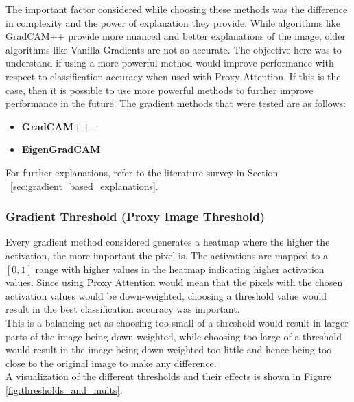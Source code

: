 \documentclass[a4paper,11pt,openright]{book}
\begin{document}
The important factor considered while choosing these methods was the difference in complexity and the power of explanation they provide. While algorithms like GradCAM++ \cite{chattopadhayGradCAMGeneralizedGradientBased2018} provide more nuanced and better explanations of the image, older algorithms like Vanilla Gradients \cite{zeilerVisualizingUnderstandingConvolutional2013} are not so accurate. The objective here was to understand if using a more powerful method would improve performance with respect to classification accuracy when used with Proxy Attention. If this is the case, then it is possible to use more powerful methods to further improve performance in the future.
The gradient methods that were tested are as follows:
\begin{itemize}
    \item \textbf{GradCAM++} \cite{chattopadhayGradCAMGeneralizedGradientBased2018}.
    \item \textbf{EigenGradCAM} \cite{banymuhammadEigenCAMVisualExplanations2021}
\end{itemize}
For further explanations, refer to the literature survey in Section ~\ref{sec:gradient_based_explanations}.

\subsubsection{Gradient Threshold (Proxy Image Threshold)}
Every gradient method considered generates a heatmap where the higher the activation, the more important the pixel is. The activations are mapped to a $[0,1]$ range with higher values in the heatmap indicating higher activation values. Since using Proxy Attention would mean that the pixels with the chosen activation values would be down-weighted, choosing a threshold value would result in the best classification accuracy was important.\\
This is a balancing act as choosing too small of a threshold would result in larger parts of the image being down-weighted, while choosing too large of a threshold would result in the image being down-weighted too little and hence being too close to the original image to make any difference.\\
A visualization of the different thresholds and their effects is shown in Figure \ref{fig:thresholds_and_mults}.
\end{document}
